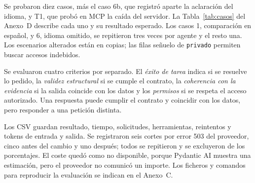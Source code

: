 Se probaron diez casos, más el caso 6b, que registró aparte la aclaración del idioma, y T1, que probó en MCP la caída del servidor. La Tabla~\ref{tab:casos} del Anexo~D describe cada uno y su resultado esperado. Los casos 1, comparación en español, y 6, idioma omitido, se repitieron tres veces por agente y el resto una. Los escenarios alterados están en copias; las filas señuelo de \texttt{privado} permiten buscar accesos indebidos.

Se evaluaron cuatro criterios por separado. El \emph{éxito de tarea} indica si se resuelve lo pedido, la \emph{validez estructural} si se cumple el contrato, la \emph{coherencia con la evidencia} si la salida coincide con los datos y los \emph{permisos} si se respeta el acceso autorizado. Una respuesta puede cumplir el contrato y coincidir con los datos, pero responder a una petición distinta.

Los CSV guardan resultado, tiempo, solicitudes, herramientas, reintentos y tokens de entrada y salida. Se registraron seis cortes por error 503 del proveedor, cinco antes del cambio y uno después; todos se repitieron y se excluyeron de los porcentajes. El coste quedó como no disponible, porque Pydantic AI muestra una estimación, pero el proveedor no comunicó un importe. Los ficheros y comandos para reproducir la evaluación se indican en el Anexo~C.
